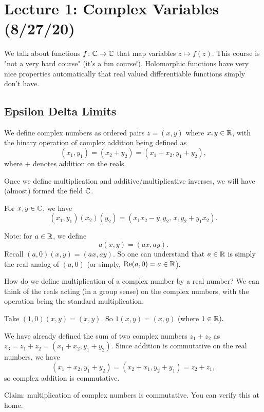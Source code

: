 \section{Lecture 1: Complex Variables (8/27/20)}
We talk about functions $ f \colon \mathbb{C} \to \mathbb{C}$ that map variables $z \mapsto f(z)$. This course is "not a very hard course" (it's a fun course!). Holomorphic functions have very nice properties automatically that real valued differentiable functions simply don't have.
\subsection{Epsilon Delta Limits}
\begin{definition}
    We define complex numbers as ordered pairs $z=(x,y)$ where $x,y \in \mathbb{R}$, with the binary operation of complex addition being defined as \[
        (x_1,y_1)=(x_2+y_2)=(x_1+x_2,y_1+y_2),
    \]
   where $+$ denotes addition on the reals. 
\end{definition}
Once we define multiplication and additive/multiplicative inverses, we will have (almost) formed the field $\mathbb{C}$. 
\begin{definition}
    For $x,y \in \mathbb{C}$, we have 
    \[
    (x_1,y_1)(x_2)(y_2)=(x_1x_2-y_1y_2,\,x_1y_2+y_1x_2).
    \]
\end{definition}
Note: for $a \in \mathbb{R}$, we define \[
    a(x,y)=(ax,ay).
\]
Recall $(a,0)(x,y)=(ax,ay).$ So one can understand that $a\in\mathbb{R}$ is simply the real analog of $(a,0)$ (or simply, $\operatorname{Re}(a,0)=a \in \mathbb{R}$).

How do we define multiplication of a complex number by a real number? We can think of the reals acting (in a group sense) on the complex numbers, with the operation being the standard multiplication.

\begin{example}
    Take $(1,0)(x,y)=(x,y).$ So $1(x,y)=(x,y)$ (where $1 \in \mathbb{R}).$
\end{example}

\begin{example}
    
We have already defined the sum of two complex numbers $z_1+z_2$ as $z_3=z_1+z_2=(x_1+x_2,y_1+y_2).$ Since addition is commutative on the real numbers, we have  \[
  (x_1+x_2,y_1+y_2)=(x_2+x_1,y_2+y_1)=z_2+z_1,
\]
so complex addition is commutative.
\end{example}

Claim: multiplication of complex numbers is commutative. You can verify this at home.


